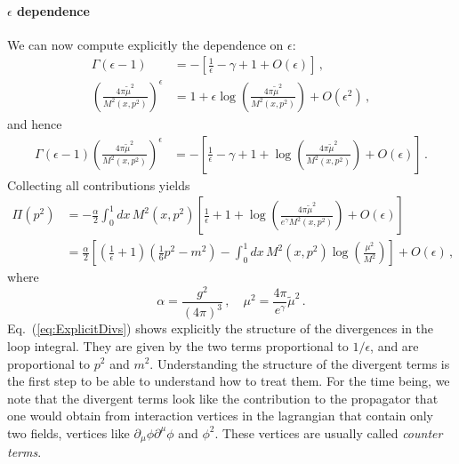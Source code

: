 \paragraph{$\epsilon$ dependence}

We can now compute explicitly the dependence on $\epsilon$:
\begin{align}
  \Gamma(\epsilon-1) &= -\left[
                       \frac{1}{\epsilon} - \gamma + 1 +O(\epsilon)
                       \right] \, , \\
  \left(\frac{4\pi\tilde{\mu}^2}{M^2(x,p^2)}\right)^\epsilon
                     &= 1 + \epsilon \log
                       \left(\frac{4\pi\tilde{\mu}^2}{M^2(x,p^2)}\right)
                       + O(\epsilon^2)\, ,
\end{align}
and hence
\begin{align}
  \Gamma(\epsilon-1)
  \left(\frac{4\pi\tilde{\mu}^2}{M^2(x,p^2)}\right)^\epsilon
  &= - \left[
    \frac{1}{\epsilon} - \gamma +1 + \log
    \left(\frac{4\pi\tilde{\mu}^2}{M^2(x,p^2)}\right) 
    + O(\epsilon)
    \right]\, .
\end{align}
Collecting all contributions yields
\begin{align}
  \Pi(p^2) &= -\frac{\alpha}{2} \int_0^1 dx\,
             M^2(x,p^2) \left[
             \frac{1}{\epsilon} +1 + \log
             \left(\frac{4\pi\tilde{\mu}^2}{e^\gamma M^2(x,p^2)}\right) 
    + O(\epsilon)
             \right] \\
  \label{eq:ExplicitDivs}
           &= \frac{\alpha}{2} \left[
             \left(\frac{1}{\epsilon}+1\right) \left(\frac{1}{6}
             p^2-m^2\right)
             - \int_0^1dx\, M^2(x,p^2) \log\left(\frac{\mu^2}{M^2}\right)
             \right]
             +O(\epsilon) \, ,
\end{align}
where
\begin{equation}
  \label{eq:DefAlpha}
  \alpha = \frac{g^2}{(4\pi)^3}\, , \quad \mu^2 =
  \frac{4\pi}{e^\gamma} \tilde{\mu}^2\, .
\end{equation}
Eq.~(\ref{eq:ExplicitDivs}) shows explicitly the structure of the
divergences in the loop integral. They are given by the two terms
proportional to $1/\epsilon$, and are proportional to $p^2$ and
$m^2$. Understanding the structure of the divergent terms is the first
step to be able to understand how to treat them. For the time being,
we note that the divergent terms look like the contribution to the
propagator that one would obtain from interaction vertices in the
lagrangian that contain only two fields, \ie vertices like
$\partial_\mu \phi \partial^\mu\phi$ and $\phi^2$. These vertices are
usually called {\em counter terms}.

